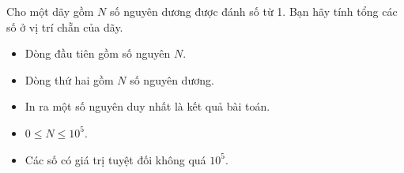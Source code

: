 ﻿\documentclass[12pt,a4paper,oneside]{article}
\begin{document}

\renewcommand{\baselinestretch}{1.25}
\setlength{\parskip}{1em}

Cho một dãy gồm $N$ số nguyên dương được đánh số từ 1. Bạn hãy tính tổng các số ở vị trí chẵn của dãy.

\setlength{\parskip}{1em}


\setlength{\parskip}{0.25em}

\begin{itemize}
    \item Dòng đầu tiên gồm số nguyên $N$.
    \item Dòng thứ hai gồm $N$ số nguyên dương.
\end{itemize}

\setlength{\parskip}{1em}


\setlength{\parskip}{0.25em}

\begin{itemize}
    \item In ra một số nguyên duy nhất là kết quả bài toán.
\end{itemize}

\setlength{\parskip}{1em}


\setlength{\parskip}{0.25em}

\begin{itemize}
    \item $0 \leq N \leq 10^5$.
    \item Các số có giá trị tuyệt đối không quá $10^5$.
\end{itemize}

\setlength{\parskip}{1em}

\renewcommand{\baselinestretch}{1.0}
\begin{example}
\end{example}
\end{document}
